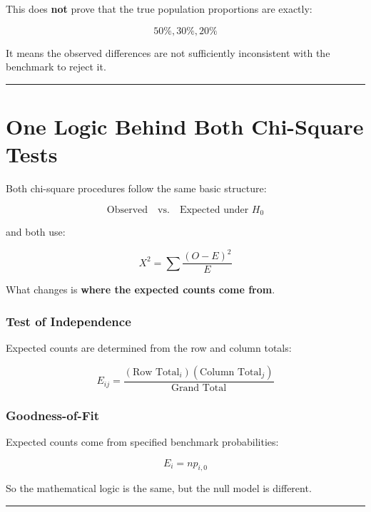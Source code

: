 \documentclass[
  letterpaper,
  DIV=11,
  numbers=noendperiod]{scrreprt}
\begin{document}
This does \textbf{not} prove that the true population proportions are
exactly:

\[
50\%,30\%,20\%
\]

It means the observed differences are not sufficiently inconsistent with
the benchmark to reject it.

\begin{center}\rule{0.5\linewidth}{0.5pt}\end{center}


\chapter{One Logic Behind Both Chi-Square
Tests}\label{one-logic-behind-both-chi-square-tests}

Both chi-square procedures follow the same basic structure:

\[
\boxed{
\text{Observed}
\quad\text{vs.}\quad
\text{Expected under }H_0
}
\]

and both use:

\[
\boxed{
X^2
=
\sum
\frac{(O-E)^2}{E}
}
\]

What changes is \textbf{where the expected counts come from}.

\subsection{Test of Independence}\label{test-of-independence}

Expected counts are determined from the row and column totals:

\[
E_{ij}
=
\frac{
(\text{Row Total}_i)
(\text{Column Total}_j)
}{
\text{Grand Total}
}
\]

\subsection{Goodness-of-Fit}\label{goodness-of-fit}

Expected counts come from specified benchmark probabilities:

\[
E_i=np_{i,0}
\]

So the mathematical logic is the same, but the null model is different.

\begin{center}\rule{0.5\linewidth}{0.5pt}\end{center}

\end{document}
